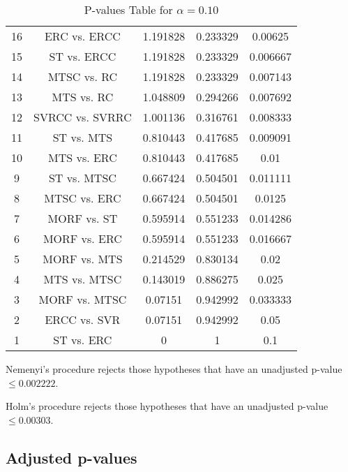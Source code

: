 \documentclass[a4paper,10pt]{article}
\begin{document}
\begin{landscape}
\begin{table}[!htp]
\begin{tabular}{ccccc}
16&ERC vs. ERCC&1.191828&0.233329&0.00625\\
15&ST vs. ERCC&1.191828&0.233329&0.006667\\
14&MTSC vs. RC&1.191828&0.233329&0.007143\\
13&MTS vs. RC&1.048809&0.294266&0.007692\\
12&SVRCC vs. SVRRC&1.001136&0.316761&0.008333\\
11&ST vs. MTS&0.810443&0.417685&0.009091\\
10&MTS vs. ERC&0.810443&0.417685&0.01\\
9&ST vs. MTSC&0.667424&0.504501&0.011111\\
8&MTSC vs. ERC&0.667424&0.504501&0.0125\\
7&MORF vs. ST&0.595914&0.551233&0.014286\\
6&MORF vs. ERC&0.595914&0.551233&0.016667\\
5&MORF vs. MTS&0.214529&0.830134&0.02\\
4&MTS vs. MTSC&0.143019&0.886275&0.025\\
3&MORF vs. MTSC&0.07151&0.942992&0.033333\\
2&ERCC vs. SVR&0.07151&0.942992&0.05\\
1&ST vs. ERC&0&1&0.1\\
\hline
\end{tabular}
\caption{P-values Table for $\alpha=0.10$}
\end{table}Nemenyi's procedure rejects those hypotheses that have an unadjusted p-value $\le0.002222$.

Holm's procedure rejects those hypotheses that have an unadjusted p-value $\le0.00303$.

\pagebreak

\subsection{Adjusted p-values}


\end{landscape}
\end{document}

